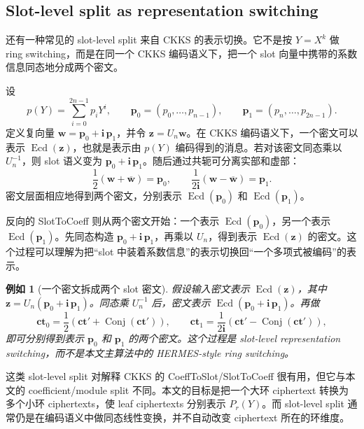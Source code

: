 \documentclass[UTF8,11pt]{article}
\newcommand{\ct}{\mathbf{ct}}
\theoremstyle{definition}
\theoremstyle{plain}
\newtheorem{example}{例如}
\begin{document}
\subsection{Slot-level split as representation switching}
\label{subsec:slot-level-representation-switching}

还有一种常见的 slot-level split 来自 CKKS 的表示切换。它不是按 \(Y=X^k\) 做 ring switching，而是在同一个 CKKS 编码语义下，把一个 slot 向量中携带的系数信息同态地分成两个密文。

设
\[
p(Y)=\sum_{i=0}^{2n-1}p_iY^i,\qquad
\mathbf p_0=(p_0,\ldots,p_{n-1}),\qquad
\mathbf p_1=(p_n,\ldots,p_{2n-1}).
\]
定义复向量 \(\mathbf w=\mathbf p_0+\mathbf i\,\mathbf p_1\)，并令 \(\mathbf z=U_n\mathbf w\)。在 CKKS 编码语义下，一个密文可以表示 \(\operatorname{Ecd}(\mathbf z)\)，也就是表示由 \(p(Y)\) 编码得到的消息。若对该密文同态乘以 \(U_n^{-1}\)，则 slot 语义变为 \(\mathbf p_0+\mathbf i\,\mathbf p_1\)。随后通过共轭可分离实部和虚部：
\[
\frac12(\mathbf w+\overline{\mathbf w})=\mathbf p_0,
\qquad
\frac{1}{2\mathbf i}(\mathbf w-\overline{\mathbf w})=\mathbf p_1.
\]
密文层面相应地得到两个密文，分别表示 \(\operatorname{Ecd}(\mathbf p_0)\) 和 \(\operatorname{Ecd}(\mathbf p_1)\)。

反向的 SlotToCoeff 则从两个密文开始：一个表示 \(\operatorname{Ecd}(\mathbf p_0)\)，另一个表示 \(\operatorname{Ecd}(\mathbf p_1)\)。先同态构造 \(\mathbf p_0+\mathbf i\,\mathbf p_1\)，再乘以 \(U_n\)，得到表示 \(\operatorname{Ecd}(\mathbf z)\) 的密文。这个过程可以理解为把“slot 中装着系数信息”的表示切换回“一个多项式被编码”的表示。

\begin{example}[一个密文拆成两个 slot 密文]
假设输入密文表示 \(\operatorname{Ecd}(\mathbf z)\)，其中 \(\mathbf z=U_n(\mathbf p_0+\mathbf i\,\mathbf p_1)\)。同态乘 \(U_n^{-1}\) 后，密文表示 \(\operatorname{Ecd}(\mathbf p_0+\mathbf i\,\mathbf p_1)\)。再做
\[
\ct_0=\frac12(\ct'+\operatorname{Conj}(\ct')),
\qquad
\ct_1=\frac{1}{2\mathbf i}(\ct'-\operatorname{Conj}(\ct')),
\]
即可分别得到表示 \(\mathbf p_0\) 和 \(\mathbf p_1\) 的两个密文。这个过程是 slot-level representation switching，而不是本文主算法中的 HERMES-style ring switching。
\end{example}

这类 slot-level split 对解释 CKKS 的 CoeffToSlot/SlotToCoeff 很有用，但它与本文的 coefficient/module split 不同。本文的目标是把一个大环 ciphertext 转换为多个小环 ciphertexts，使 leaf ciphertexts 分别表示 \(P_r(Y)\)。而 slot-level split 通常仍是在编码语义中做同态线性变换，并不自动改变 ciphertext 所在的环维度。
\end{document}
